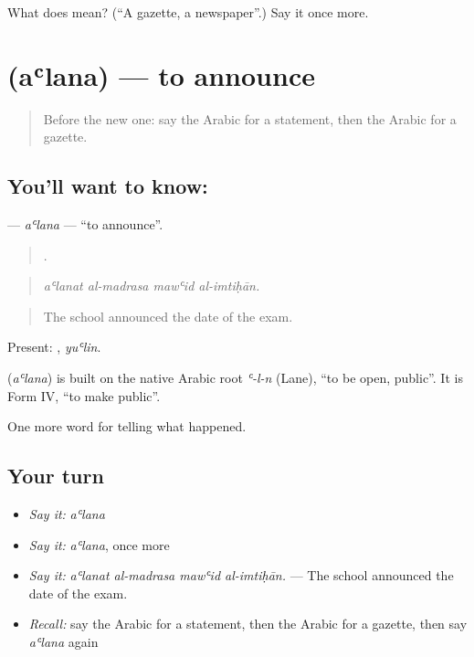 \begin{tcolorbox}[breakable,colback=teal!4,colframe=teal!35!black,title={Before you move on}]
What does  mean? (\textquotedblleft{}A gazette, a newspaper\textquotedblright{}.) Say it once more.
\end{tcolorbox}
\section[\texorpdfstring{\ar{أعلن} (aʿlana)}{أعلن (aʿlana)}]{ (aʿlana) — to announce}

\label{lesson:AR-C293-alana}



\begin{quote}
Before the new one: say the Arabic for a statement, then the Arabic for a gazette.
\end{quote}

\subsection*{You'll want to know: }
\textbf{} — \emph{aʿlana} — \textquotedblleft{}to announce\textquotedblright{}.

\begin{quote}
   .
\end{quote}

\begin{quote}
\emph{aʿlanat al-madrasa mawʿid al-imtiḥān.}
\end{quote}

\begin{quote}
The school announced the date of the exam.
\end{quote}

Present: , \emph{yuʿlin}.

\begin{cousinweb}
\textbf{} (\emph{aʿlana}) is built on the native Arabic root \emph{ʿ-l-n} (Lane), \textquotedblleft{}to be open, public\textquotedblright{}. It is Form IV, \textquotedblleft{}to make public\textquotedblright{}.
\end{cousinweb}

\begin{grammarlens}[title={What you've built}]
One more word for telling what happened.
\end{grammarlens}

\subsection*{Your turn}
\begin{itemize}
\raggedright
  \item \emph{Say it:} \emph{aʿlana}
  \item \emph{Say it:} \emph{aʿlana}, once more
  \item \emph{Say it:} \emph{aʿlanat al-madrasa mawʿid al-imtiḥān.} — The school announced the date of the exam.
  \item \emph{Recall:} say the Arabic for a statement, then the Arabic for a gazette, then say \emph{aʿlana} again
\end{itemize}

